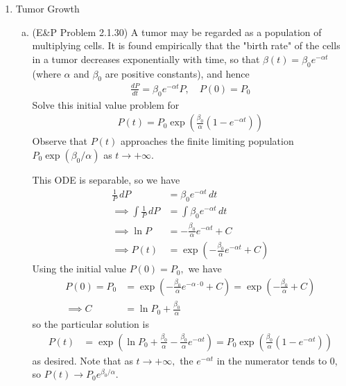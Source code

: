 \documentclass{article}
\begin{document}
\begin{enumerate}
		\newpage
	\item Tumor Growth
		\begin{enumerate}[(a)]
			\item (E\&P Problem 2.1.30) A tumor may be regarded as a population of multiplying cells. It is found empirically that the "birth rate" of the cells in a tumor decreases exponentially with time, so that $\beta(t)=\beta_0e^{-\alpha t}$ (where $\alpha$ and $\beta_0$ are positive constants), and hence
				\begin{align*}
					\frac{dP}{dt} = \beta_0 e^{-\alpha t}P, \quad P(0)=P_0
				\end{align*}
				Solve this initial value problem for
				\begin{align*}
					P(t)=P_0\exp\left( \frac{\beta_0}{\alpha}\left( 1-e^{-\alpha t} \right) \right)
				\end{align*}
				Observe that $P(t)$ approaches the finite limiting population $P_0\exp(\beta_0/\alpha)$ as $t\to+\infty.$
				\begin{soln}
					This ODE is separable, so we have
					\begin{align*}
						\frac{1}{P}\, dP &= \beta_0 e^{-\alpha t}\, dt \\
						\implies \int \frac{1}{P}\, dP &= \int \beta_0 e^{-\alpha t}\, dt \\
						\implies \ln P &= -\frac{\beta_0}{\alpha} e^{-\alpha t} + C \\
						\implies P(t) &= \exp\left(-\frac{\beta_0}{\alpha} e^{-\alpha t} + C\right)
					\end{align*}
					Using the initial value $P(0)=P_0,$ we have 
					\begin{align*}
						P(0) = P_0 &= \exp\left( -\frac{\beta_0}{\alpha} e^{-\alpha\cdot 0} + C \right) = \exp\left( -\frac{\beta_0}{\alpha} + C \right) \\
						\implies C &= \ln P_0 + \frac{\beta_0}{\alpha}
					\end{align*}
					so the particular solution is
					\begin{align*}
						P(t) &= \exp\left( \ln P_0 + \frac{\beta_0}{\alpha} - \frac{\beta_0}{\alpha} e^{-\alpha t} \right) = P_0 \exp\left( \frac{\beta_0}{\alpha} (1-e^{-\alpha t}) \right)
					\end{align*}
					as desired. Note that as $t\to+\infty,$ the $e^{-\alpha t}$ in the numerator tends to 0, so $P(t)\to P_0 e^{\beta_0/\alpha}.$
				\end{soln}


\end{enumerate}
\end{enumerate}
\end{document}
